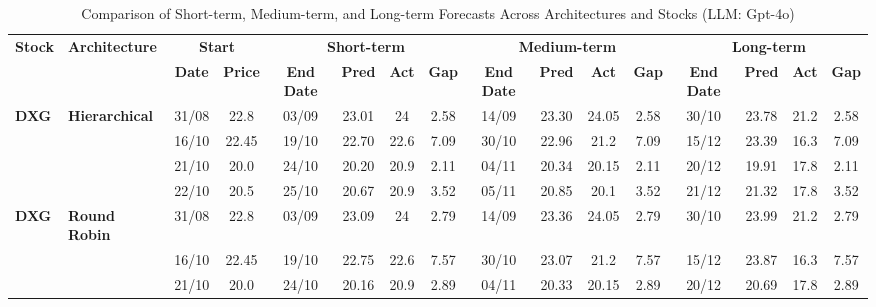 \documentclass{ieeeaccess}
\begin{document}
\clearpage
\onecolumn
\begin{table}[!h]
\centering
\caption{Comparison of Short-term, Medium-term, and Long-term Forecasts Across Architectures and Stocks (LLM: Gpt-4o)}
\label{tab:full_forecast}
\setlength{\tabcolsep}{3pt}
\renewcommand{\arraystretch}{1.05}
\scriptsize
\begin{tabular}{llcc|cccc|cccc|cccc}
\toprule
\multirow{2}{*}{\textbf{Stock}} &
\multirow{2}{*}{\textbf{Architecture}} &
\multicolumn{2}{c|}{\textbf{Start}} &
\multicolumn{4}{c|}{\textbf{Short-term}} &
\multicolumn{4}{c|}{\textbf{Medium-term}} &
\multicolumn{4}{c}{\textbf{Long-term}} \\
\cmidrule(lr){3-4}
\cmidrule(lr){5-8}
\cmidrule(lr){9-12}
\cmidrule(lr){13-16}
& &
\textbf{Date} & \textbf{Price} &
\textbf{End Date} & \textbf{Pred} & \textbf{Act} & \textbf{Gap} &
\textbf{End Date} & \textbf{Pred} & \textbf{Act} & \textbf{Gap} &
\textbf{End Date} & \textbf{Pred} & \textbf{Act} & \textbf{Gap} \\
\midrule


\multirow{4}{*}{\textbf{DXG}} 
& \textbf{Hierarchical}
& 31/08 & 22.8 & 03/09 & 23.01 & 24 & 2.58 & 14/09 & 23.30 & 24.05 & 2.58 & 30/10 & 23.78 & 21.2 & 2.58 \\

& 
& 16/10 & 22.45 & 19/10 & 22.70 & 22.6 & 7.09 & 30/10 & 22.96 & 21.2 & 7.09 & 15/12 & 23.39 & 16.3 & 7.09 \\

& 
& 21/10 & 20.0 & 24/10 & 20.20 & 20.9 & 2.11 & 04/11 & 20.34 & 20.15 & 2.11 & 20/12 & 19.91 & 17.8 & 2.11 \\

&
& 22/10 & 20.5 & 25/10 & 20.67 & 20.9 & 3.52 & 05/11 & 20.85 & 20.1 & 3.52 & 21/12 & 21.32 & 17.8 & 3.52 \\
\midrule


\multirow{4}{*}{\textbf{DXG}} 
& \textbf{Round Robin}
& 31/08 & 22.8 & 03/09 & 23.09 & 24 & 2.79 & 14/09 & 23.36 & 24.05 & 2.79 & 30/10 & 23.99 & 21.2 & 2.79 \\

&
& 16/10 & 22.45 & 19/10 & 22.75 & 22.6 & 7.57 & 30/10 & 23.07 & 21.2 & 7.57 & 15/12 & 23.87 & 16.3 & 7.57 \\

&
& 21/10 & 20.0 & 24/10 & 20.16 & 20.9 & 2.89 & 04/11 & 20.33 & 20.15 & 2.89 & 20/12 & 20.69 & 17.8 & 2.89 \\


\end{tabular}
\end{table}
\end{document}
